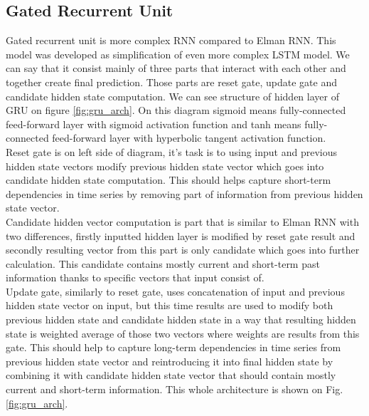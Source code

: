 \subsection{Gated Recurrent Unit}
 
Gated recurrent unit is more complex RNN compared to Elman RNN. This model was developed as simplification of even more complex LSTM model. We can say that it consist mainly of three parts that interact with each other and together create final prediction. Those parts are reset gate, update gate and candidate hidden state computation. We can see structure of hidden layer of GRU on figure \ref{fig:gru_arch}. On this diagram sigmoid means fully-connected feed-forward layer with sigmoid activation function and tanh means fully-connected feed-forward layer with hyperbolic tangent activation function.
\\

Reset gate is on left side of diagram, it's task is to using input and previous hidden state vectors modify previous hidden state vector which goes into candidate hidden state computation. This should helps capture short-term dependencies in time series by removing part of information from previous hidden state vector.
\\

Candidate hidden vector computation is part that is similar to Elman RNN with two differences, firstly inputted hidden layer is modified by reset gate result and secondly resulting vector from this part is only candidate which goes into further calculation. This candidate contains mostly current and short-term past information thanks to specific vectors that input consist of. 
\\

Update gate, similarly to reset gate, uses concatenation of input and previous hidden state vector on input, but this time results are used to modify both previous hidden state and candidate hidden state in a way that resulting hidden state is weighted average of those two vectors where weights are results from this gate. This should help to capture long-term dependencies in time series from previous hidden state vector and reintroducing it into final hidden state by combining it with candidate hidden state vector that should contain mostly current and short-term information. This whole architecture is shown on Fig. \ref{fig:gru_arch}.
\\ 

